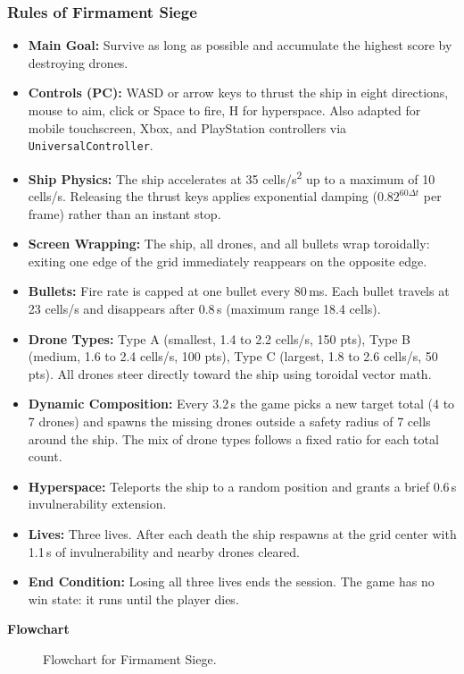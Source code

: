 \documentclass[12pt,letterpaper]{article}
\begin{document}
\subsubsection{Rules of Firmament Siege}
\begin{itemize}
  \item \textbf{Main Goal:} Survive as long as possible and accumulate the highest score by destroying drones.
  \item \textbf{Controls (PC):} WASD or arrow keys to thrust the ship in eight directions, mouse to aim, click or Space to fire, H for hyperspace. Also adapted for mobile touchscreen, Xbox, and PlayStation controllers via \texttt{UniversalController}.
  \item \textbf{Ship Physics:} The ship accelerates at 35 cells/s\textsuperscript{2} up to a maximum of 10 cells/s. Releasing the thrust keys applies exponential damping ($0.82^{60\Delta t}$ per frame) rather than an instant stop.
  \item \textbf{Screen Wrapping:} The ship, all drones, and all bullets wrap toroidally: exiting one edge of the grid immediately reappears on the opposite edge.
  \item \textbf{Bullets:} Fire rate is capped at one bullet every 80\,ms. Each bullet travels at 23 cells/s and disappears after 0.8\,s (maximum range 18.4 cells).
  \item \textbf{Drone Types:} Type A (smallest, 1.4 to 2.2 cells/s, 150 pts), Type B (medium, 1.6 to 2.4 cells/s, 100 pts), Type C (largest, 1.8 to 2.6 cells/s, 50 pts). All drones steer directly toward the ship using toroidal vector math.
  \item \textbf{Dynamic Composition:} Every 3.2\,s the game picks a new target total (4 to 7 drones) and spawns the missing drones outside a safety radius of 7 cells around the ship. The mix of drone types follows a fixed ratio for each total count.
  \item \textbf{Hyperspace:} Teleports the ship to a random position and grants a brief 0.6\,s invulnerability extension.
  \item \textbf{Lives:} Three lives. After each death the ship respawns at the grid center with 1.1\,s of invulnerability and nearby drones cleared.
  \item \textbf{End Condition:} Losing all three lives ends the session. The game has no win state: it runs until the player dies.
\end{itemize}

\textbf{Flowchart}
\begin{figure}[H]
  \centering
  
  \caption{Flowchart for Firmament Siege.}
  \label{fig:firmamentsiege_flow}
\end{figure}
\end{document}
